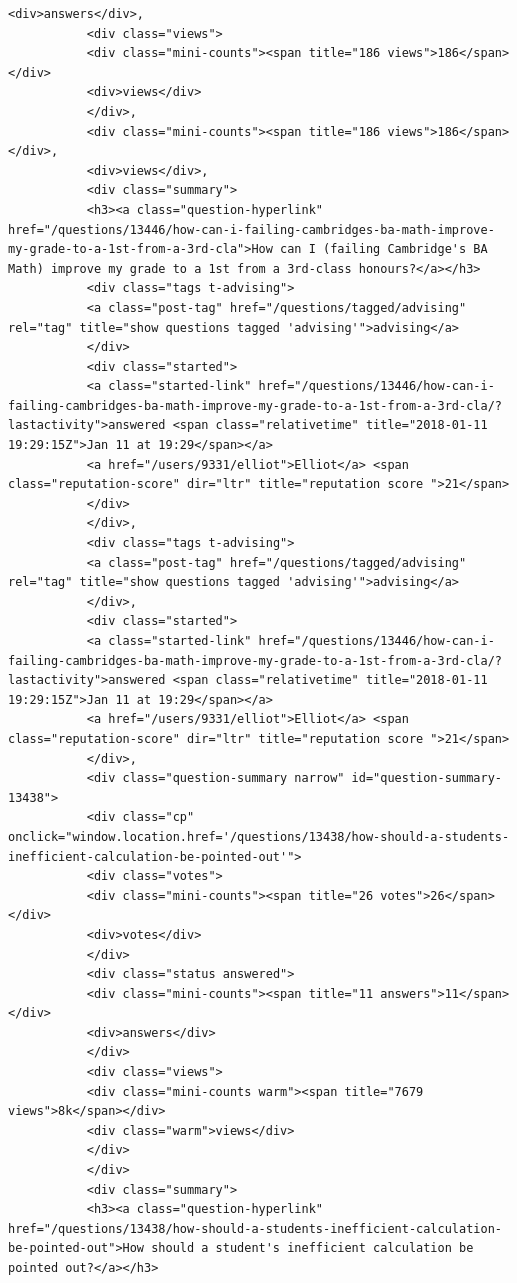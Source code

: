\documentclass[11pt]{article}
\begin{document}
\begin{Verbatim}[commandchars=\\\{\}]
           <div>answers</div>,
           <div class="views">
           <div class="mini-counts"><span title="186 views">186</span></div>
           <div>views</div>
           </div>,
           <div class="mini-counts"><span title="186 views">186</span></div>,
           <div>views</div>,
           <div class="summary">
           <h3><a class="question-hyperlink" href="/questions/13446/how-can-i-failing-cambridges-ba-math-improve-my-grade-to-a-1st-from-a-3rd-cla">How can I (failing Cambridge's BA Math) improve my grade to a 1st from a 3rd-class honours?</a></h3>
           <div class="tags t-advising">
           <a class="post-tag" href="/questions/tagged/advising" rel="tag" title="show questions tagged 'advising'">advising</a>
           </div>
           <div class="started">
           <a class="started-link" href="/questions/13446/how-can-i-failing-cambridges-ba-math-improve-my-grade-to-a-1st-from-a-3rd-cla/?lastactivity">answered <span class="relativetime" title="2018-01-11 19:29:15Z">Jan 11 at 19:29</span></a>
           <a href="/users/9331/elliot">Elliot</a> <span class="reputation-score" dir="ltr" title="reputation score ">21</span>
           </div>
           </div>,
           <div class="tags t-advising">
           <a class="post-tag" href="/questions/tagged/advising" rel="tag" title="show questions tagged 'advising'">advising</a>
           </div>,
           <div class="started">
           <a class="started-link" href="/questions/13446/how-can-i-failing-cambridges-ba-math-improve-my-grade-to-a-1st-from-a-3rd-cla/?lastactivity">answered <span class="relativetime" title="2018-01-11 19:29:15Z">Jan 11 at 19:29</span></a>
           <a href="/users/9331/elliot">Elliot</a> <span class="reputation-score" dir="ltr" title="reputation score ">21</span>
           </div>,
           <div class="question-summary narrow" id="question-summary-13438">
           <div class="cp" onclick="window.location.href='/questions/13438/how-should-a-students-inefficient-calculation-be-pointed-out'">
           <div class="votes">
           <div class="mini-counts"><span title="26 votes">26</span></div>
           <div>votes</div>
           </div>
           <div class="status answered">
           <div class="mini-counts"><span title="11 answers">11</span></div>
           <div>answers</div>
           </div>
           <div class="views">
           <div class="mini-counts warm"><span title="7679 views">8k</span></div>
           <div class="warm">views</div>
           </div>
           </div>
           <div class="summary">
           <h3><a class="question-hyperlink" href="/questions/13438/how-should-a-students-inefficient-calculation-be-pointed-out">How should a student's inefficient calculation be pointed out?</a></h3>

\end{Verbatim}
\end{document}
